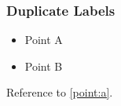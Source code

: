 \begin{frame}
\frametitle{Duplicate Labels}
\begin{itemize}
    \item Point A \label{point:a}
    \item Point B \label{point:a}
\end{itemize}
Reference to \ref{point:a}.
\end{frame}
